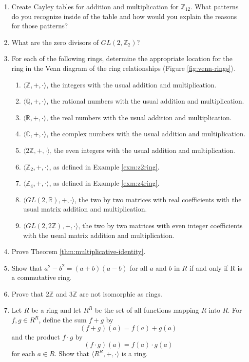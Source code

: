 \documentclass[
]{book}
\providecommand{\tightlist}{%
  \setlength{\itemsep}{0pt}\setlength{\parskip}{0pt}}
\theoremstyle{definition}
\theoremstyle{definition}
\theoremstyle{definition}
\theoremstyle{definition}
\theoremstyle{remark}
\begin{document}
\begin{enumerate}
\def\labelenumi{\arabic{enumi}.}
\item
  Create Cayley tables for addition and multiplication for \(\mathbb{Z}_{12}\). What patterns do you recognize inside of the table and how would you explain the reasons for those patterns?
\item
  What are the zero divisors of \(GL(2,\mathbb{Z}_2)\)?
\item
  For each of the following rings, determine the appropriate location for the ring in the Venn diagram of the ring relationships (Figure \ref{fig:venn-rings}).

  \begin{enumerate}
  \def\labelenumii{\alph{enumii}.}
  \tightlist
  \item
    \(\langle\mathbb{Z},+,\cdot\rangle\), the integers with the usual addition and multiplication.
  \item
    \(\langle\mathbb{Q},+,\cdot\rangle\), the rational numbers with the usual addition and multiplication.
  \item
    \(\langle\mathbb{R},+,\cdot\rangle\), the real numbers with the usual addition and multiplication.
  \item
    \(\langle\mathbb{C},+,\cdot\rangle\), the complex numbers with the usual addition and multiplication.
  \item
    \(\langle2\mathbb{Z},+,\cdot\rangle\), the even integers with the usual addition and multiplication.
  \item
    \(\langle\mathbb{Z}_2,+,\cdot\rangle\), as defined in Example \ref{exm:z2ring}.
  \item
    \(\langle\mathbb{Z}_4,+,\cdot\rangle\), as defined in Example \ref{exm:z4ring}.
  \item
    \(\langle GL(2,\mathbb{R}),+,\cdot\rangle\), the two by two matrices with real coefficients with the usual matrix addition and multiplication.
  \item
    \(\langle GL(2,2\mathbb{Z}),+,\cdot\rangle\), the two by two matrices with even integer coefficients with the usual matrix addition and multiplication.
  \end{enumerate}
\item
  Prove Theorem \ref{thm:multiplicative-identity}.
\item
  Show that \(a^2-b^2=(a+b)(a-b)\) for all \(a\) and \(b\) in \(R\) if and only if R is a commutative ring.
\item
  Prove that \(2\mathbb{Z}\) and \(3\mathbb{Z}\) are not isomorphic as rings.
\item
  Let \(R\) be a ring and let \(R^R\) be the set of all functions mapping \(R\) into \(R\). For \(f,g\in R^R\), define the sum \(f+g\) by \[(f+g)(a)=f(a)+g(a)\] and the product \(f\cdot g\) by \[(f\cdot g)(a)=f(a)\cdot g(a)\] for each \(a \in R\). Show that \(\langle R^R, +, \cdot\rangle\) is a ring.
\end{enumerate}
\end{document}
